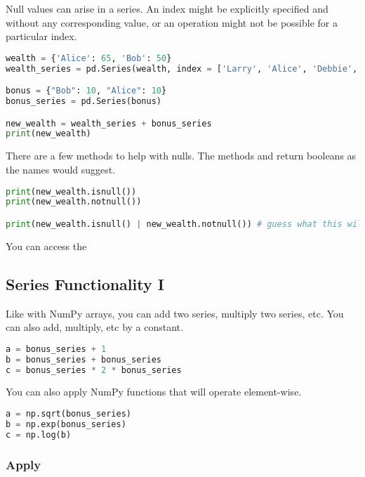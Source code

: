 \smallskip
\noindent Null values can arise in a series. An index might be explicitly specified and without any corresponding value, or an operation might not be possible for a particular index. 

\begin{lstlisting}[language = Python]
wealth = {'Alice': 65, 'Bob': 50}
wealth_series = pd.Series(wealth, index = ['Larry', 'Alice', 'Debbie', 'Bob'])

bonus = {"Bob": 10, "Alice": 10}
bonus_series = pd.Series(bonus)

new_wealth = wealth_series + bonus_series
print(new_wealth)
\end{lstlisting}

\smallskip
\noindent There are a few methods to help with nulls. The methods  and  return booleans as the names would suggest.

\begin{lstlisting}[language = Python]
print(new_wealth.isnull())
print(new_wealth.notnull())

print(new_wealth.isnull() | new_wealth.notnull()) # guess what this will be
\end{lstlisting}

\smallskip
You can access the 



\subsection{Series Functionality I}

Like with NumPy arrays, you can add two series, multiply two series, etc. You can also add, multiply, etc by a constant. 

\begin{lstlisting}[language = Python]
a = bonus_series + 1
b = bonus_series + bonus_series
c = bonus_series * 2 * bonus_series
\end{lstlisting}

You can also apply NumPy functions that will operate element-wise. 

\begin{lstlisting}[language = Python]
a = np.sqrt(bonus_series)
b = np.exp(bonus_series)
c = np.log(b)
\end{lstlisting}

\subsubsection{Apply}

